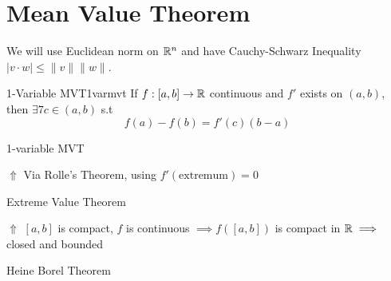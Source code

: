 \chapter{Mean Value Theorem}
We will use Euclidean norm on $\mathbb{R}^n$ and have Cauchy-Schwarz Inequality $|v\cdot w|\leq \|v\|\|w\|$.
\begin{theorem}{1-Variable MVT}{1varmvt}
	If $f:[a,b]\to \mathbb{R}$ continuous and $f'$ exists on $(a,b)$, then $\exists7 c\in(a,b)$ s.t $$f(a)-f(b)=f'(c)(b-a)$$
\end{theorem}
\begin{myproof}1-variable MVT

	\hspace{1cm} $\Uparrow$ Via Rolle's Theorem, using $f'(\text{extremum})=0$

	\hspace*{0.5cm}Extreme Value Theorem

	\hspace{1cm} $\Uparrow$ $[a,b]$ is compact, $f$ is continuous $\implies f([a,b])$ is compact in $\mathbb{R}\implies $ closed and bounded

	\hspace*{0.5cm}Heine Borel Theorem
\end{myproof}

